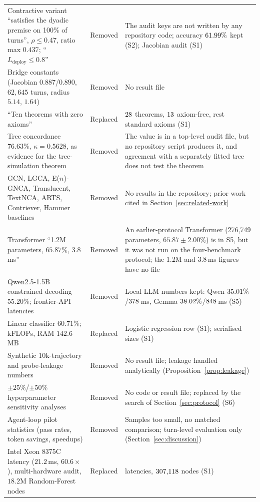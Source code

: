 \documentclass[10pt,twocolumn,letterpaper]{article}
\begin{document}
\begin{table}[p]
\begin{tabularx}{\textwidth}{@{}>{\raggedright\arraybackslash}p{5.6cm}>{\raggedright\arraybackslash}p{2.2cm}>{\raggedright\arraybackslash}X@{}}
Contractive variant ``satisfies the dyadic premise on 100\% of turns'', $\rho\le0.47$, ratio max $0.437$; ``$L_{\text{deploy}}\le0.8$'' & Removed & The audit keys are not written by any repository code; accuracy $61.99\%$ kept (S2); Jacobian audit (S1) \\
Bridge constants (Jacobian $0.887$/$0.890$, $62{,}645$ turns, radius $5.14$, $1.64$) & Removed & No result file \\
``Ten theorems with zero axioms'' & Replaced & $28$ theorems, $13$ axiom-free, rest standard axioms (S1) \\
Tree concordance $76.63\%$, $\kappa=0.5628$, as evidence for the tree-simulation theorem & Removed & The value is in a top-level audit file, but no repository script produces it, and agreement with a separately fitted tree does not test the theorem \\
GCN, LGCA, E($n$)-GNCA, Translucent, TextNCA, ARTS, Contriever, Hammer baselines & Removed & No results in the repository; prior work cited in Section~\ref{sec:related-work} \\
Transformer ``1.2M parameters, $65.87\%$, 3.8\,ms'' & Removed & An earlier-protocol Transformer (276{,}749 parameters, $65.87\pm2.00\%$) is in S5, but it was not run on the four-benchmark protocol; the 1.2M and 3.8\,ms figures have no file \\
Qwen2.5-1.5B constrained decoding $55.20\%$; frontier-API latencies & Removed & Local LLM numbers kept: Qwen $35.01\%$/$378$\,ms, Gemma $38.02\%$/$848$\,ms (S5) \\
Linear classifier $60.71\%$; kFLOPs, RAM $142.6$\,MB & Replaced & Logistic regression row (S1); serialised sizes (S1) \\
Synthetic 10k-trajectory and probe-leakage numbers & Removed & No result file; leakage handled analytically (Proposition~\ref{prop:leakage}) \\
$\pm25\%$/$\pm50\%$ hyperparameter sensitivity analyses & Removed & No code or result file; replaced by the search of Section~\ref{sec:protocol} (S6) \\
Agent-loop pilot statistics (pass rates, token savings, speedups) & Removed & Samples too small, no matched comparison; turn-level evaluation only (Section~\ref{sec:discussion}) \\
Intel Xeon 8375C latency ($21.2$\,ms, $60.6\times$), multi-hardware audit, $18.2$M Random-Forest nodes & Replaced & \numCpuName{} latencies, $307{,}118$ nodes (S1) \\

\end{tabularx}
\end{table}
\end{document}
